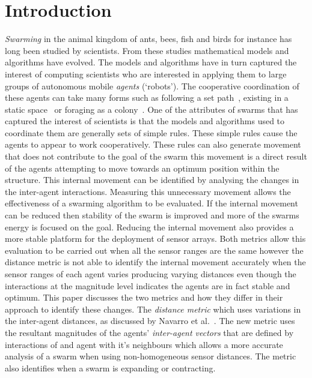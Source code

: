 \documentclass{ieeeaccess}
\begin{document}
\section{Introduction\label{sec:intro}}

\emph{Swarming} in the animal kingdom of ants, bees, fish and birds for instance has long been studied by scientists. From these studies mathematical models and algorithms have evolved. The models and algorithms have in turn captured the interest of computing scientists who are interested in applying them to large groups of autonomous mobile \emph{agents} (`robots'). The cooperative coordination of these agents can take many forms such as following a set path~\cite{HCS:09}, existing in a static space~\cite{EP:10, GP:02, GP:04} or foraging as a colony~\cite{HER:11, GK:07}. One of the attributes of swarms that has captured the interest of scientists is that the models and algorithms used to coordinate them are generally sets of simple rules. These simple rules cause the agents to appear to work cooperatively. These rules can also generate movement that does not contribute to the goal of the swarm this movement is a direct result of the agents attempting to move towards an optimum position within the structure. This internal movement can be identified by analysing the changes in the inter-agent interactions. Measuring this unnecessary movement allows the effectiveness of a swarming algorithm to be evaluated. If the internal movement can be reduced then stability of the swarm is improved and more of the swarms energy is focused on the goal. Reducing the internal movement also provides a more stable platform for the deployment of sensor arrays. Both metrics allow this evaluation to be carried out when all the sensor ranges are the same however the distance metric is not able to identify the internal movement accurately when the sensor ranges of each agent varies producing varying distances even though the interactions at the magnitude level indicates the agents are in fact stable and optimum. This paper discusses the two metrics and how they differ in their approach to identify these changes. The \emph{distance metric} which uses variations in the inter-agent distances, as discussed by Navarro et al.~\cite{NIM:09}. The new metric uses the resultant magnitudes of the agents' \emph{inter-agent vectors} that are defined by interactions of and agent with it's neighbours which allows a more accurate analysis of a swarm when using non-homogeneous sensor distances. The metric also identifies when a swarm is expanding or contracting. 
\end{document}
